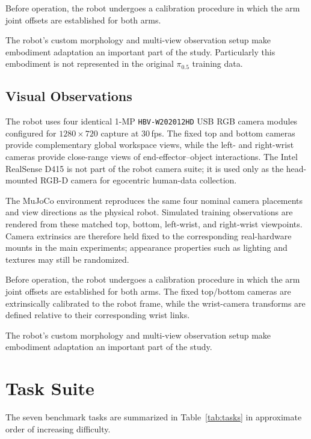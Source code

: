 \documentclass[10pt,conference]{IEEEtran}
\begin{document}
Before operation, the robot undergoes a calibration procedure in which the arm
joint offsets are established for both arms.

The robot's custom morphology and multi-view observation setup make embodiment
adaptation an important part of the study. Particularly this embodiment
is not represented in the original $\pi_{0.5}$ training data.

\subsection{Visual Observations}

The robot uses four identical 1-MP \texttt{HBV-W202012HD} USB RGB camera
modules configured for \(1280\times720\) capture at 30\,fps. The fixed top and
bottom cameras provide complementary global workspace views, while the left-
and right-wrist cameras provide close-range views of end-effector--object
interactions. The Intel RealSense D415 is not part of the robot camera suite;
it is used only as the head-mounted RGB-D camera for egocentric human-data
collection.

The MuJoCo environment reproduces the same four nominal camera placements and
view directions as the physical robot. Simulated training observations are
rendered from these matched top, bottom, left-wrist, and right-wrist viewpoints.
Camera extrinsics are therefore held fixed to the corresponding real-hardware
mounts in the main experiments; appearance properties such as lighting and
textures may still be randomized.

Before operation, the robot undergoes a calibration procedure in which the arm joint
offsets are established for both arms. The fixed top/bottom cameras are
extrinsically calibrated to the robot frame, while the wrist-camera transforms
are defined relative to their corresponding wrist links.

The robot's custom morphology and multi-view observation setup make embodiment
adaptation an important part of the study.

\section{Task Suite}
\label{sec:tasks}

The seven benchmark tasks are summarized in
Table~\ref{tab:tasks} in approximate order of increasing difficulty.
\end{document}
